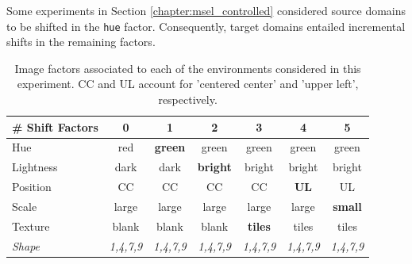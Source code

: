 \begin{definition} Some experiments in Section \ref{chapter:msel_controlled}
    considered source domains to be shifted in the \texttt{hue} factor. Consequently, target
    domains entailed incremental shifts in the remaining factors.

    \begin{table}[H]
        \centering
        \begin{tabular}{l|c|c|c|c|c|c}
        \# Shift Factors & 0 & 1 & 2 & 3 & 4 & 5 \\
        \midrule
        Hue & red & \textbf{green} & green & green & green & green \\
        Lightness & dark & dark & \textbf{bright} & bright & bright & bright \\
        Position  & CC & CC & CC & CC & \textbf{UL} & UL \\
        Scale  & large & large & large & large & large & \textbf{small} \\
        Texture & blank & blank & blank & \textbf{tiles} & tiles & tiles \\
        \textit{Shape} & \textit{1,4,7,9} &  \textit{1,4,7,9} &  \textit{1,4,7,9} & \textit{1,4,7,9} & \textit{1,4,7,9} & \textit{1,4,7,9} \\
        \bottomrule
        \end{tabular}
        \caption{
        Image factors associated to each of the environments considered in this experiment. CC and UL account
        for 'centered center' and 'upper left', respectively.
        }
        \label{ds:hue_test}
    \end{table}
\end{definition}

